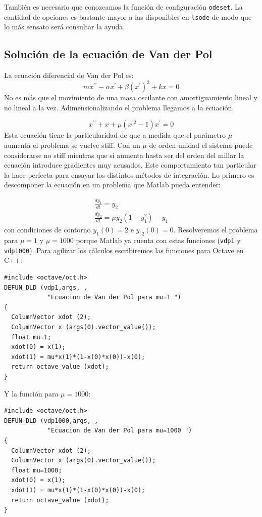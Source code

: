 También es necesario que conozcamos la función de configuración \texttt{odeset}.
La cantidad de opciones es bastante mayor a las disponibles en \texttt{lsode}
de modo que lo más sensato será consultar la ayuda.


\subsection{Solución de la ecuación de Van der Pol}

La ecuación diferencial de Van der Pol es:
$$ mx^{\prime\prime}-\alpha
x^{\prime}+\beta\left(x^{\prime}\right)^{3}+kx=0$$
 No es más que el
movimiento de una masa oscilante con amortiguamiento lineal y no
lineal a la vez. Adimensionalizando el problema llegamos a la
ecuación.

$$x^{\prime\prime}+x+\mu(x^{\prime2}-1)x^{\prime}=0$$
 Esta ecuación
tiene la particularidad de que a medida que el parámetro $\mu$ aumenta
el problema se vuelve stiff. Con un $\mu$ de orden unidad el sistema
puede considerarse no stiff mientras que si aumenta hasta ser del
orden del millar la ecuación introduce gradientes muy acusados. Este
comportamiento tan particular la hace perfecta para ensayar los
distintos métodos de integración. Lo primero es descomponer la
ecuación en un problema que Matlab pueda entender:

$$
\begin{array}{l}
  \frac{dy_{1}}{dt}=y_{2}\\
  \frac{dy_{2}}{dt}=\mu y_{2}(1-y_{1}^{2})-y_{1}\end{array}$$
con condiciones de contorno $y_{1}(0)=2$ e $y_{:2}(0)=0$. Resolveremos
el problema para $\mu=1$ y $\mu=1000$ porque Matlab ya cuenta con
estas funciones (\texttt{vdp1} y \texttt{vdp1000}). Para agilizar
los cálculos escribiremos las funciones para Octave en C++:

\begin{verbatim}
#include <octave/oct.h>
DEFUN_DLD (vdp1,args, ,
            "Ecuacion de Van der Pol para mu=1 ")
{
  ColumnVector xdot (2);
  ColumnVector x (args(0).vector_value());
  float mu=1;
  xdot(0) = x(1);
  xdot(1) = mu*x(1)*(1-x(0)*x(0))-x(0);
  return octave_value (xdot);
}
\end{verbatim}
Y la función para $\mu=1000$:

  \begin{verbatim}
#include <octave/oct.h>
DEFUN_DLD (vdp1000,args, ,
            "Ecuacion de Van der Pol para mu=1000 ")
{
  ColumnVector xdot (2);
  ColumnVector x (args(0).vector_value());
  float mu=1000;
  xdot(0) = x(1);  
  xdot(1) = mu*x(1)*(1-x(0)*x(0))-x(0);
  return octave_value (xdot);
}
\end{verbatim}

